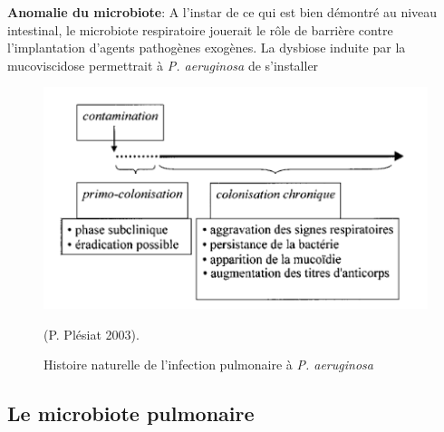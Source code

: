 \documentclass[12pt,a4paper]{article}
\begin{document}
\textbf{Anomalie du microbiote\cite{Keravec2015,HoMan2017,Nguyen2015}}:
A l'instar de ce qui est bien démontré au niveau intestinal, le microbiote respiratoire jouerait le rôle de barrière contre l'implantation d'agents pathogènes exogènes. La dysbiose induite par la mucoviscidose permettrait à \textit{P. aeruginosa} de s'installer


\begin{figure}[ht]
\begin{center}
\includegraphics[scale=0.8]{img/chronic.png}\hfill
\end{center}
\caption{Histoire naturelle de l'infection pulmonaire à \textit{P. aeruginosa}} 
\centering (P. Plésiat 2003\cite{Plesiat}).
\label{bach}
\end{figure}


\subsection{Le microbiote pulmonaire}
\end{document}
